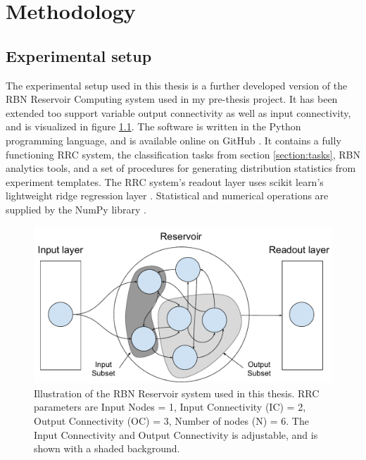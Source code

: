 \chapter{Methodology}
\label{chapter:methodology}

\section{Experimental setup}

The experimental setup used in this thesis is a further developed version of the RBN Reservoir Computing system used in my pre-thesis project.
It has been extended too support variable output connectivity as well as input connectivity,
and is visualized in figure \ref{figure:rbn-reservoir-subsets}.
The software is written in the Python programming language,
and is available online on GitHub \cite{masters-thesis-code-github}.
It contains a fully functioning RRC system,
the classification tasks from section \ref{section:tasks},
RBN analytics tools,
and a set of procedures for generating distribution statistics from experiment templates.
The RRC system's readout layer uses scikit learn's lightweight ridge regression layer \cite{scikit-learn}.
Statistical and numerical operations are supplied by the NumPy library \cite{van2011numpy}.

\begin{figure}
    \centering
    \caption{
        Illustration of the RBN Reservoir system used in this thesis.
        RRC parameters are Input Nodes = 1, Input Connectivity (IC) = 2, Output Connectivity (OC) = 3, Number of nodes (N) = 6.
        The Input Connectivity and Output Connectivity is adjustable,
        and is shown with a shaded background.
    }
    \label{figure:rbn-reservoir-subsets}
    \includegraphics[width=\columnwidth]{method/rbn_reservoir_subsets.pdf}
\end{figure}

